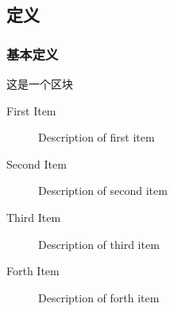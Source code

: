 \documentclass[11pt,c,compress,UTF8]{ctexbeamer}
\begin{document}
\subsection{定义}
\begin{frame} 
\frametitle{基本定义}
\begin{block}{}
        这是一个区块
\end{block}
\begin{description}
\item[First Item] Description of first item
\item[Second Item] Description of second item
\item[Third Item] Description of third item
\item[Forth Item] Description of forth item
\end{description}
\end{frame}
\end{document}
